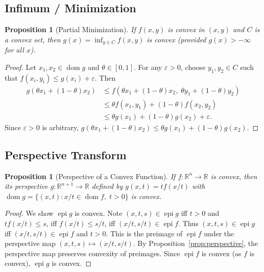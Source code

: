 \documentclass[11pt,a4paper]{article}
\newtheorem{proposition}[theorem]{Proposition}
\theoremstyle{definition}
\theoremstyle{remark}
\newcommand{\R}{\mathbb{R}}
\DeclareMathOperator{\dom}{dom}
\DeclareMathOperator{\epi}{epi}
\begin{document}
\subsection{Infimum / Minimization}

\begin{proposition}[Partial Minimization]
\label{prop:partial-min}
If $f(x, y)$ is convex in $(x, y)$ and $C$ is a convex set, then
$g(x) = \inf_{y \in C} f(x, y)$ is convex (provided $g(x) > -\infty$ for all $x$).
\end{proposition}

\begin{proof}
Let $x_1, x_2 \in \dom g$ and $\theta \in [0,1]$. For any $\varepsilon > 0$, choose
$y_1, y_2 \in C$ such that $f(x_i, y_i) \le g(x_i) + \varepsilon$. Then
\begin{align*}
  g(\theta x_1 + (1-\theta) x_2)
  &\le f(\theta x_1 + (1-\theta)x_2, \; \theta y_1 + (1-\theta) y_2) \\
  &\le \theta f(x_1, y_1) + (1-\theta) f(x_2, y_2) \\
  &\le \theta g(x_1) + (1-\theta) g(x_2) + \varepsilon.
\end{align*}
Since $\varepsilon > 0$ is arbitrary, $g(\theta x_1 + (1-\theta) x_2) \le \theta g(x_1)
+ (1-\theta) g(x_2)$.
\end{proof}

\subsection{Perspective Transform}

\begin{proposition}[Perspective of a Convex Function]
\label{prop:perspective-function}
If $f : \R^n \to \R$ is convex, then its \emph{perspective}
$g : \R^{n+1} \to \R$ defined by $g(x, t) = t f(x/t)$ with $\dom g = \{(x,t) :
x/t \in \dom f, \; t > 0\}$ is convex.
\end{proposition}

\begin{proof}
We show $\epi g$ is convex. Note $(x, t, s) \in \epi g$ iff $t > 0$ and
$tf(x/t) \le s$, iff $f(x/t) \le s/t$, iff $(x/t, s/t) \in \epi f$. Thus
$(x, t, s) \in \epi g$ iff $(x/t, s/t) \in \epi f$ and $t > 0$. This is the preimage
of $\epi f$ under the perspective map $(x, t, s) \mapsto (x/t, s/t)$.
By Proposition~\ref{prop:perspective}, the perspective map preserves convexity of
preimages. Since $\epi f$ is convex (as $f$ is convex), $\epi g$ is convex.
\end{proof}
\end{document}
